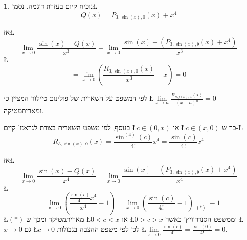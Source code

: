 \documentclass[english,hebrew]{article}
\theoremstyle{plain}
\theoremstyle{definition}
\theoremstyle{definition}
\newtheorem*{sol*}{\protect\solutionname}
\providecommand{\solutionname}{פתרון}
\begin{document}
\begin{sol*}
נוכיח קיום בעזרת דוגמה. נסמן\L{%
\[
Q(x)=P_{3,\sin(x),0}(x)+x^{4}
\]
}%

אז\L{%
\[
\underset{x\rightarrow0}{\lim}\frac{\sin\left(x\right)-Q\left(x\right)}{x^{3}}=\underset{x\rightarrow0}{\lim}\frac{\sin\left(x\right)-\left(P_{3,\sin(x),0}(x)+x^{4}\right)}{x^{3}}
\]
}%
\L{%
\[
=\underset{x\rightarrow0}{\lim}\left(\frac{R_{3,\sin\left(x\right),0}(x)}{x^{3}}-x\right)=0
\]
}%

לפי המשפט על השארית של פולינום טיילור המציין כי \L{$\underset{x\rightarrow a}{\lim}\frac{R_{n,f\left(x\right),a}(x)}{\left(x-a\right)^{n}}=0$}
ומאריתמטיקה.

בנוסף, לפי משפט השארית בצורת לגראנז' קיים \L{$c\in\left(0,x\right)$}
או \L{$c\in\left(x,0\right)$} כך ש-\L{%
\[
R_{3,\sin\left(x\right),0}(x)=\frac{\sin^{(4)}(c)}{4!}x^{4}=\frac{\sin(c)}{4!}x^{4}
\]
}%

אז\L{%
\[
\underset{x\rightarrow0}{\lim}\frac{\sin\left(x\right)-Q\left(x\right)}{x^{4}}=\underset{x\rightarrow0}{\lim}\frac{\sin\left(x\right)-\left(P_{3,\sin(x),0}(x)+x^{4}\right)}{x^{4}}
\]
}%
\L{%
\[
=\underset{x\rightarrow0}{\lim}\left(\frac{\frac{\sin(c)}{4!}x^{4}}{x^{4}}-1\right)=\underset{x\rightarrow0}{\lim}\left(\frac{\sin(c)}{4!}-1\right)\underset{\left(*\right)}{=}-1
\]
}%
 \L{$\left(*\right)$} מאריתמטיקה ומכך ש-\L{$0<c<x$} או \L{$0>c>x$}
וממשפט הסנדרוויץ' כאשר \L{$x\rightarrow0$} גם \L{$c\rightarrow0$}
לכן לפי משפט ההצבה בגבולות \L{$\underset{x\rightarrow0}{\lim}\frac{\sin(c)}{4!}=\frac{\sin(0)}{4!}=0$}.
\end{sol*}
\end{document}

